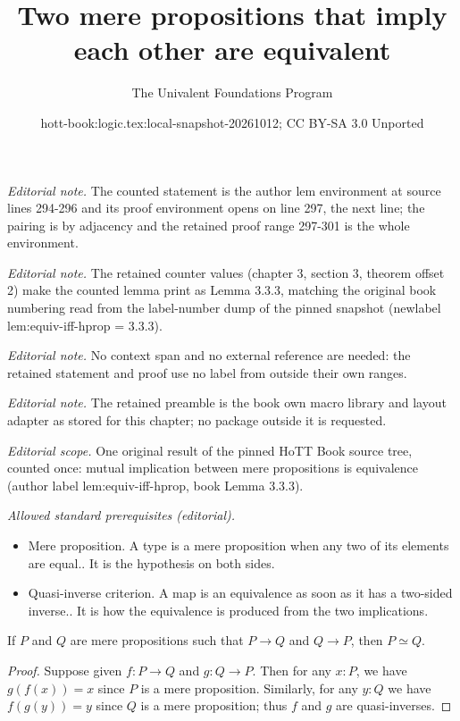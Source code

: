 \documentclass[10pt,a4paper]{article}
\title{Two mere propositions that imply each other are equivalent}
\author{The Univalent Foundations Program}
\date{hott-book:logic.tex:local-snapshot-20261012; CC BY-SA 3.0 Unported}
\newcounter{chapter}
\newcommand{\eqv}[2]{\ensuremath{#1 \simeq #2}\xspace}
\theoremstyle{definition}
\theoremstyle{remark}
\numberwithin{equation}{section}
\begin{document}
\maketitle
\setcounter{chapter}{3}
\setcounter{section}{3}
\setcounter{thm}{2}
\noindent\textit{Editorial note.} The counted statement is the author lem environment at source lines 294-296 and its proof environment opens on line 297, the next line; the pairing is by adjacency and the retained proof range 297-301 is the whole environment.\par\medskip
\noindent\textit{Editorial note.} The retained counter values (chapter 3, section 3, theorem offset 2) make the counted lemma print as Lemma 3.3.3, matching the original book numbering read from the label-number dump of the pinned snapshot (newlabel lem:equiv-iff-hprop = 3.3.3).\par\medskip
\noindent\textit{Editorial note.} No context span and no external reference are needed: the retained statement and proof use no label from outside their own ranges.\par\medskip
\noindent\textit{Editorial note.} The retained preamble is the book own macro library and layout adapter as stored for this chapter; no package outside it is requested.\par\medskip
\noindent\textit{Editorial scope.} One original result of the pinned HoTT Book source tree, counted once: mutual implication between mere propositions is equivalence (author label lem:equiv-iff-hprop, book Lemma 3.3.3).\par\medskip
\noindent\textit{Allowed standard prerequisites (editorial).}\begin{itemize}
\item Mere proposition. A type is a mere proposition when any two of its elements are equal.. It is the hypothesis on both sides.
\item Quasi-inverse criterion. A map is an equivalence as soon as it has a two-sided inverse.. It is how the equivalence is produced from the two implications.
\end{itemize}\medskip
\begin{lem}\label{lem:equiv-iff-hprop}
  If $P$ and $Q$ are mere propositions such that $P\to Q$ and $Q\to P$, then $\eqv P Q$.
\end{lem}

\begin{proof}
  Suppose given $f:P\to Q$ and $g:Q\to P$.
  Then for any $x:P$, we have $g(f(x))=x$ since $P$ is a mere proposition.
  Similarly, for any $y:Q$ we have $f(g(y))=y$ since $Q$ is a mere proposition; thus $f$ and $g$ are quasi-inverses.
\end{proof}
\end{document}
